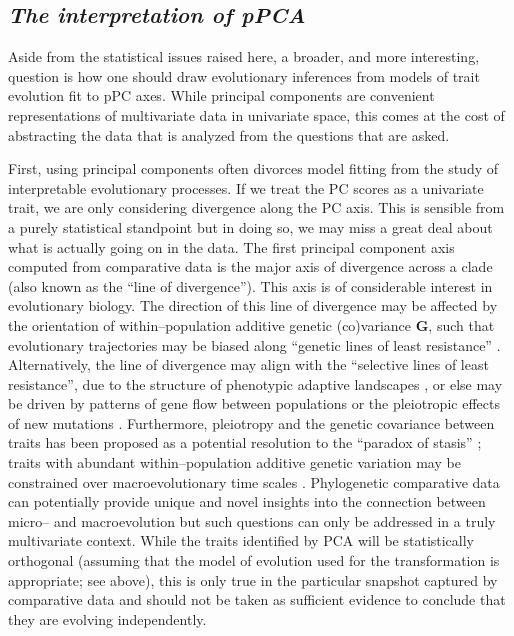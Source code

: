 \documentclass[a4paper,12pt]{article}
\begin{document}
\subsection{\emph{The interpretation of pPCA}}

Aside from the statistical issues raised here, a broader, and more interesting, question is how one should draw evolutionary inferences from models of trait evolution fit to pPC axes. While principal components are convenient representations of multivariate data in univariate space, this comes at the cost of abstracting the data that is analyzed from the questions that are asked. 

First, using principal components often divorces model fitting from the study of interpretable evolutionary processes. If we treat the PC scores as a univariate trait, we are only considering divergence along the PC axis. This is sensible from a purely statistical standpoint but in doing so, we may miss a great deal about what is actually going on in the data. The first principal component axis computed from comparative data is the major axis of divergence across a clade (also known as the ``line of divergence''). This axis is of considerable interest in evolutionary biology. The direction of this line of divergence may be affected by the orientation of within--population additive genetic (co)variance $\mathbf{G}$, such that evolutionary trajectories may be biased along ``genetic lines of least resistance'' \citep[i.e., divergence occurs primarily along the leading eigenvector of $\mathbf{G}$, $G_{\text{max}}$;][]{Schluter1996}. Alternatively, the line of divergence may align with the ``selective lines of least resistance'', due to the structure of phenotypic adaptive landscapes \citep{Arnold2003, Jonesetal2007, Arnoldetal2008}, or else may be driven by patterns of gene flow between populations \citep{Guillaume2007} or the pleiotropic effects of new mutations \citep{Jonesetal2007, Hether2013, Houle2013}. Furthermore, pleiotropy and the genetic covariance between traits has been proposed as a potential resolution to the ``paradox of stasis'' \citep{HansenHoule2004}; traits with abundant within--population additive genetic variation may be constrained over macroevolutionary time scales \citep{WalshBlows2009}. Phylogenetic comparative data can potentially provide unique and novel insights into the connection between micro-- and macroevolution \citep{Hohenlohe2008} but such questions can only be addressed in a truly multivariate context. While the traits identified by PCA will be statistically orthogonal (assuming that the model of evolution used for the transformation is appropriate; see above), this is only true in the particular snapshot captured by comparative data and should not be taken as sufficient evidence to conclude that they are evolving independently.
\end{document}
